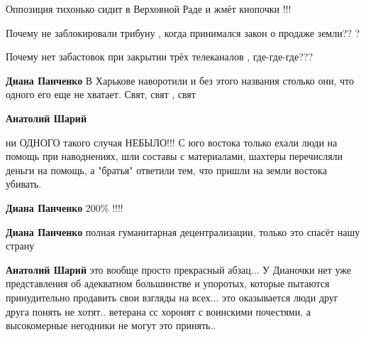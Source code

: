 \begin{itemize}
\begin{itemize}
Оппозиция тихонько сидит в Верховной Раде и жмёт кнопочки !!!

Почему не заблокировали трибуну , когда принимался закон о продаже земли?? ?

Почему нет забастовок при закрытии трёх телеканалов , где-где-где???

 
\textbf{Диана Панченко} В Харькове наворотили и без этого названия столько они,
что одного его еще не хватает. Свят, свят , свят

 
\textbf{Анатолий Шарий} 

ни ОДНОГО такого случая НЕБЫЛО!!! С юго востока только ехали люди на помощь при
наводнениях, шли составы с материалами, шахтеры перечисляли деньги на помощь, а
"братья" ответили тем, что пришли на земли востока убивать.

 
\textbf{Диана Панченко} 200\% !!!!

 
\textbf{Диана Панченко} полная гуманитарная децентрализации, только это спасёт нашу страну

 
\textbf{Анатолий Шарий} это вообще просто прекрасный абзац... У Дианочки нет
уже представления об адекватном большинстве и упоротых, которые пытаются
принудительно продавить свои взгляды на всех... это оказывается люди друг друга
понять не хотят.. ветерана сс хоронят с воинскими почестями, а высокомерные
негодники не могут это принять..


\end{itemize}
\end{itemize}
